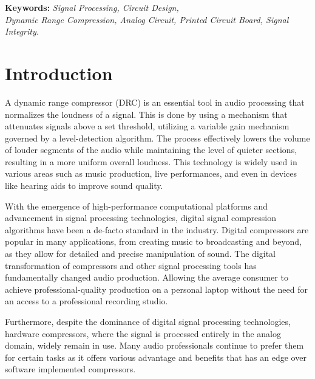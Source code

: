 \documentclass[10pt]{article}
\begin{document}
    \begin{multicols*}{2}

        \textbf{Keywords:} \textit{Signal Processing, Circuit Design,\\Dynamic Range Compression, Analog Circuit, Printed Circuit Board, Signal Integrity.}

        \section{Introduction}
            A dynamic range compressor (DRC) is an essential tool in audio processing that normalizes the loudness of a signal. This is done by using a mechanism that attenuates signals above a set threshold, utilizing a variable gain mechanism governed by a level-detection algorithm. The process effectively lowers the volume of louder segments of the audio while maintaining the level of quieter sections, resulting in a more uniform overall loudness. This technology is widely used in various areas such as music production, live performances, and even in devices like hearing aids to improve sound quality.\par
            With the emergence of high-performance computational platforms and advancement in signal processing technologies, digital signal compression algorithms have been a de-facto standard in the industry. Digital compressors are popular in many applications, from creating music to broadcasting and beyond, as they allow for detailed and precise manipulation of sound. The digital transformation of compressors and other signal processing tools has fundamentally changed audio production. Allowing the average consumer to achieve professional-quality production on a personal laptop without the need for an access to a professional recording studio.\par
            Furthermore, despite the dominance of digital signal processing technologies, hardware compressors, where the signal is processed entirely in the analog domain, widely remain in use. Many audio professionals continue to prefer them for certain tasks as it offers various advantage and benefits that has an edge over software implemented compressors.\par

\end{multicols*}
\end{document}
